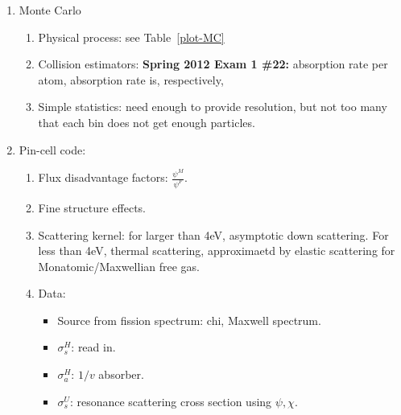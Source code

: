 \documentclass{school-22.211-notes}
\begin{document}
\clearpage
{}
\begin{enumerate}




\item Monte Carlo
  \begin{enumerate}
    \item Physical process:  see Table~\ref{plot-MC}
    \item Collision estimators: \textbf{Spring 2012 Exam 1 \#22:}   absorption  rate per atom, absorption rate is, respectively, 
    \item Simple statistics:  need enough to provide resolution, but not too many that each bin does not get enough particles.
  \end{enumerate}
  
\item Pin-cell code: 
  \begin{enumerate}
    \item Flux disadvantage factors: $\frac{\psi^M}{\psi^F}$. 
    \item Fine structure effects. 
    \item Scattering kernel: for larger than 4eV, asymptotic down scattering. For less than 4eV, thermal scattering, approximaetd by elastic scattering for Monatomic/Maxwellian free gas. 
    \item Data: 
      \begin{itemize}
        \item Source from fission spectrum: chi, Maxwell spectrum.
        \item $\sigma_s^H$: read in.
        \item $\sigma_a^H$: $1/v$ absorber.
        \item $\sigma_s^U$: resonance scattering cross section using $\psi, \chi$. 
      \end{itemize}
  \end{enumerate}


\end{enumerate}
\end{document}
